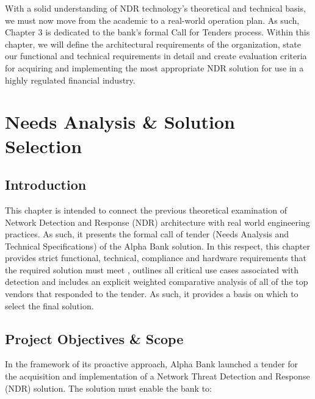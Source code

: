 \documentclass[12pt,a4paper]{report}
\begin{document}
With a solid understanding of NDR technology's theoretical and technical basis, we must now move from the academic to a real-world operation plan. As such, Chapter 3 is dedicated to the bank's formal Call for Tenders process. Within this chapter, we will define the architectural requirements of the organization, state our functional and technical requirements in detail and create evaluation criteria for acquiring and implementing the most appropriate NDR solution for use in a highly regulated financial industry.


\chapter{Needs Analysis \& Solution Selection}

\section{Introduction}
This chapter is intended to connect the previous theoretical examination of Network Detection and Response (NDR) architecture with real world engineering practices. As such, it presents the formal call of tender (Needs Analysis and Technical Specifications) of the Alpha Bank solution. In this respect, this chapter provides strict functional, technical, compliance and hardware requirements that the required solution must meet , outlines all critical use cases associated with detection and includes an explicit weighted comparative analysis of all of the top vendors that responded to the tender. As such, it provides a basis on which to select the final solution.


\section{Project Objectives \& Scope}

In the framework of its proactive approach, Alpha Bank launched a tender for the acquisition
and implementation of a Network Threat Detection and Response (NDR) solution. The
solution must enable the bank to:
\end{document}
